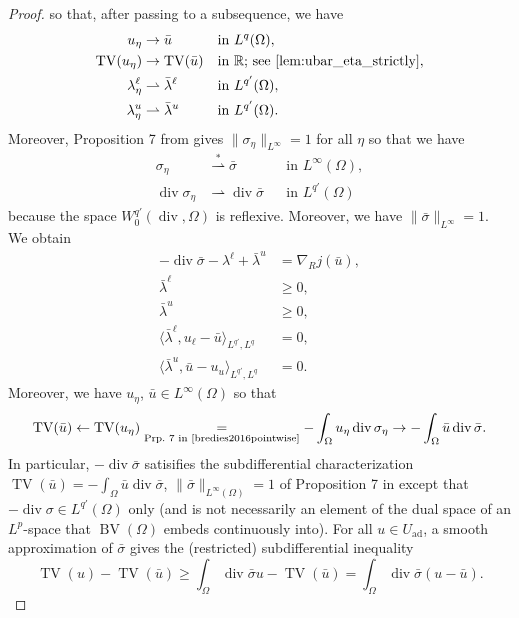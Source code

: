 \documentclass[11pt]{article}
\newcommand{\R}{\mathbb{R}}
\DeclareMathOperator*{\BV}{BV}
\DeclareMathOperator*{\TV}{TV}
\DeclareMathOperator*{\dvg}{div}
\newcommand{\weakto}{\rightharpoonup}
\newcommand{\weakstarto}{\stackrel{\ast}{\rightharpoonup}}
\newcommand{\feas}{U_{\textrm{ad}}}
\theoremstyle{definition}
\theoremstyle{remark}
\begin{document}
\begin{proof}
%
so that, after passing to a subsequence, we have
%
\begin{align*}
u_\eta &\to \bar{u} &&\text{in } L^{q}(\Omega),\\
\TV(u_\eta) &\to \TV(\bar{u}) && \text{in }\R\text{; see \cref{lem:ubar_eta_strictly}},\\
\lambda^\ell_\eta &\weakto \bar{\lambda}^\ell &&\text{in } L^{q'}(\Omega),\\
\lambda^u_\eta &\weakto \bar{\lambda}^u &&\text{in } L^{q'}(\Omega).
\end{align*}
%
Moreover, Proposition 7 from \cite{bredies2016pointwise} gives
$\|\sigma_\eta\|_{L^\infty} = 1$ for all $\eta$ so that we have
%
\begin{align*}
\sigma_\eta &\weakstarto \bar{\sigma}       &&\text{in } L^\infty(\Omega),\\
\dvg \sigma_\eta &\weakto \dvg \bar{\sigma} &&\text{in } L^{q'}(\Omega)
\end{align*}
%
because the space $W^{q'}_0(\dvg,\Omega)$ is reflexive. Moreover, we have $\|\bar{\sigma}\|_{L^\infty} = 1$.
We obtain
%
\begin{align*}
-\dvg \bar{\sigma} - \lambda^\ell + \bar{\lambda}^u &= \nabla_R j(\bar{u}),\\
\bar{\lambda}^\ell &\ge 0,\\
\bar{\lambda}^u &\ge 0,\\
\langle\bar{\lambda}^\ell, u_\ell - \bar{u}\rangle_{L^{q'},L^{q}} &= 0,\\
\langle\bar{\lambda}^u, \bar{u} - u_u\rangle_{L^{q'},L^{q}} &= 0.
\end{align*}
%
Moreover, we have $u_\eta$, $\bar{u} \in L^\infty(\Omega)$ so that
%
\[ \TV(\bar{u}) \leftarrow \TV(u_\eta) \underset{\text{Prp.\ 7 in \cite{bredies2016pointwise}}}= -\int_\Omega u_\eta \dvg \sigma_\eta \to -\int_\Omega \bar{u} \dvg \bar{\sigma}.
\]
%
In particular, $-\dvg \bar{\sigma}$ satisifies the subdifferential characterization
$\TV(\bar{u}) = -\int_\Omega \bar{u}\dvg \bar{\sigma}$, $\|\bar{\sigma}\|_{L^\infty(\Omega)} = 1$
of Proposition 7 in \cite{bredies2016pointwise} except that
$-\dvg \sigma \in L^{q'}(\Omega)$ only (and is not necessarily an element
of the dual space of an $L^p$-space that $\BV(\Omega)$ embeds continuously into).
For all $u \in \feas$, a smooth approximation of $\bar{\sigma}$ \cite{hintermuller2015density}
gives the (restricted) subdifferential inequality
%
\[ \TV(u) - \TV(\bar{u})
   \ge \int_{\Omega} \dvg \bar{\sigma} u - \TV(\bar{u})
     = \int_{\Omega} \dvg \bar{\sigma}(u - \bar{u}).
\]
\end{proof}
\end{document}
